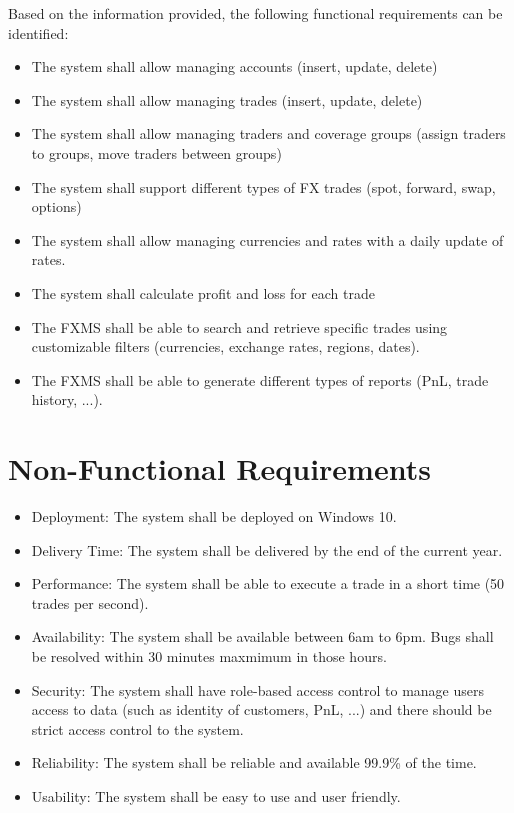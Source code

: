 \documentclass[a4paper]{report}
\begin{document}
Based on the information provided, the following functional requirements can be identified:
\begin{itemize}
    \item The system shall allow managing accounts (insert, update, delete)
    \item The system shall allow managing trades (insert, update, delete)
    \item The system shall allow managing traders and coverage groups (assign traders to groups, move traders between groups)
    \item The system shall support different types of FX trades (spot, forward, swap, options)
    \item The system shall allow managing currencies and rates with a daily update of rates.
    \item The system shall calculate profit and loss for each trade
    \item The FXMS shall be able to search and retrieve specific trades using customizable filters (currencies, exchange rates, regions, dates).
    \item The FXMS shall be able to generate different types of reports (PnL, trade history, ...).
\end{itemize}

\chapter{Non-Functional Requirements}

\begin{itemize}
    \item Deployment: The system shall be deployed on Windows 10.
    \item Delivery Time: The system shall be delivered by the end of the current year.
    \item Performance: The system shall be able to execute a trade in a short time (50 trades per second).
    \item Availability: The system shall be available between 6am to 6pm. Bugs shall be resolved within 30 minutes maxmimum in those hours.
    \item Security: The system shall have role-based access control to manage users access to data (such as identity of customers, PnL, ...) and there should be strict access control to the system.
    \item Reliability: The system shall be reliable and available 99.9\% of the time.
    \item Usability: The system shall be easy to use and user friendly.
\end{itemize}
\end{document}
